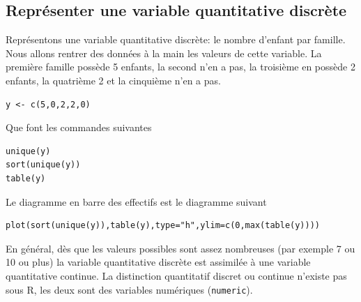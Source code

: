 \documentclass[a4paper,10pt,french]{article}
\begin{document}
\subsection{Représenter une variable quantitative discrète}
Représentons une variable quantitative discrète: le nombre d'enfant
par famille. Nous allons rentrer des données \og à la main\fg{} les
valeurs de cette variable. La première famille possède 5 enfants, la
second n'en a pas, la troisième en possède 2 enfants, la quatrième 2 et la cinquième n'en a pas.
\begin{verbatim}
y <- c(5,0,2,2,0)
\end{verbatim}

Que font les commandes suivantes
\begin{verbatim}
unique(y)
sort(unique(y))
table(y)
\end{verbatim}
Le diagramme en barre des effectifs est le diagramme suivant
\begin{verbatim}
plot(sort(unique(y)),table(y),type="h",ylim=c(0,max(table(y))))
\end{verbatim}

En général, dès que les valeurs possibles sont assez nombreuses (par
exemple 7 ou 10 ou plus) la variable quantitative discrète est
assimilée à une variable quantitative continue.  La distinction
quantitatif discret ou continue n'existe pas sous \textsf{R}, les deux sont des variables numériques (\texttt{numeric}).
\end{document}
